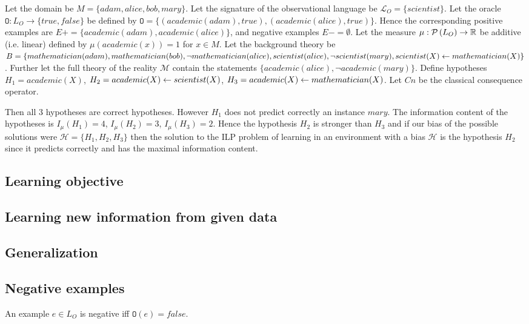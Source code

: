\begin{exmp}
Let the domain be $M=\{adam, alice, bob, mary\}$.
Let the signature of the observational language be $\mathcal{L}_O=\{scientist\}$.
Let the oracle $\mathtt{O}:L_O \to \{true, false\}$ be defined by $\mathtt{O}=\{(academic(adam),true), (academic(alice), true)\}$.
Hence the corresponding positive examples are
$E+=\{academic(adam), academic(alice)\}$, and negative examples $E-=\emptyset$.
Let the measure $\mu:\mathcal{P} \left({ L_O }\right) \to \mathbb{R}$ be additive (i.e. linear) defined by $\mu(academic(x))=1$ for $x \in M$.
Let the background theory be $B=\{mathematician(adam), mathematician(bob),
\neg mathematician(alice), scientist(alice),\\
\neg scientist(mary),
scientist(X) \leftarrow mathematician(X)
\}$.
Further let the full theory of the reality $\mathcal{M}$ contain the statements
$\{academic(alice), \neg academic(mary) \}$.
Define hypotheses
$H_1=academic(X)$,
$H_2=academic(X) \leftarrow scientist(X)$,
$H_3=academic(X) \leftarrow mathematician(X)$.
Let $Cn$ be the classical consequence operator.

Then all 3 hypotheses are correct hypotheses. However $H_1$ does not predict correctly an instance $mary$. The information content of the hypotheses is
$I_\mu(H_1)=4$, $I_\mu(H_2)=3$, $I_\mu(H_3)=2$. Hence the hypothesis $H_2$ is stronger than $H_3$ and if our bias of the possible solutions were $\mathcal{H}=\{H_1, H_2, H_3\}$ then the solution to the ILP problem of learning in an environment with a bias $\mathcal{H}$ is the hypothesis $H_2$ since it predicts correctly and has the maximal information content.
\end{exmp}

\subsection{Learning objective}
\subsection{Learning new information from given data}
\subsection{Generalization}
\subsection{Negative examples}
An example $e \in L_O$ is negative iff $\mathtt{O}(e)=false$.
